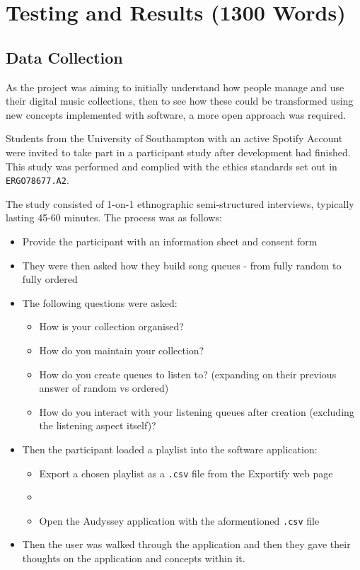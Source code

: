 \chapter{Testing and Results (1300 Words)}
\section{Data Collection}
As the project was aiming to initially understand how people manage and use their digital music collections, then to see how these could be transformed using new concepts implemented with software, a more open approach was required.

Students from the University of Southampton with an active Spotify Account were invited to take part in a participant study after development had finished. This study was performed and complied with the ethics standards set out in \lstinline|ERGO78677.A2|.

The study consisted of 1-on-1 ethnographic semi-structured interviews, typically lasting 45-60 minutes. The process was as follows:\begin{itemize}
    \item Provide the participant with an information sheet and consent form
    \item They were then asked how they build song queues - from fully random to fully ordered
    \item The following questions were asked:\begin{itemize}
        \item How is your collection organised?
        \item How do you maintain your collection?
        \item How do you create queues to listen to? (expanding on their previous answer of random vs ordered)
        \item How do you interact with your listening queues after creation (excluding the listening aspect itself)?
    \end{itemize}
    \item Then the participant loaded a playlist into the software application:\begin{itemize}
        \item Export a chosen playlist as a \lstinline|.csv| file from the Exportify web page
        \item \item Open the Audyssey application with the aformentioned \lstinline|.csv| file
    \end{itemize}
    \item Then the user was walked through the application and then they gave their thoughts on the application and concepts within it.
\end{itemize}


